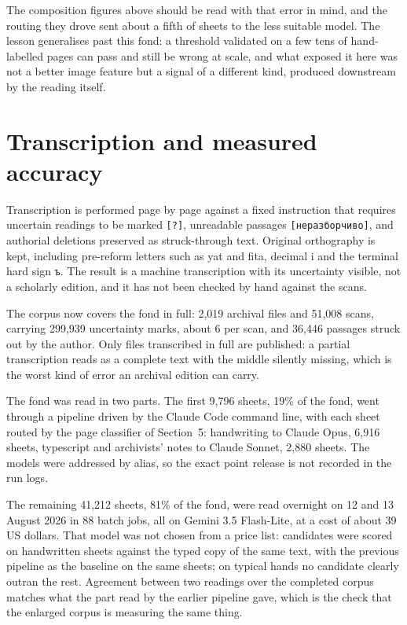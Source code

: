 \documentclass[11pt,a4paper]{article}
\begin{document}
The composition figures above should be read with that error in mind, and the
routing they drove sent about a fifth of sheets to the less suitable model.
The lesson generalises past this fond: a threshold validated on a few tens of
hand-labelled pages can pass and still be wrong at scale, and what exposed it
here was not a better image feature but a signal of a different kind, produced
downstream by the reading itself.

\section{Transcription and measured accuracy}\label{transcription-and-measured-accuracy}

Transcription is performed page by page against a fixed instruction that
requires uncertain readings to be marked \texttt{{[}?{]}}, unreadable passages
\texttt{{[}неразборчиво{]}}, and authorial deletions preserved as struck-through text.
Original orthography is kept, including pre-reform letters such as yat and
fita, decimal i and the terminal hard sign ъ. The result is a machine
transcription with its uncertainty visible, not a scholarly edition, and it
has not been checked by hand against the scans.

The corpus now covers the fond in full: 2,019 archival files and 51,008 scans,
carrying 299,939 uncertainty marks, about 6 per scan, and 36,446 passages
struck out by the author. Only files transcribed in full are published: a
partial transcription reads as a complete text with the middle silently
missing, which is the worst kind of error an archival edition can carry.

The fond was read in two parts. The first 9,796 sheets, 19\% of the fond, went
through a pipeline driven by the Claude Code command line, with each sheet
routed by the page classifier of Section~5: handwriting to Claude Opus, 6,916
sheets, typescript and archivists' notes to Claude Sonnet, 2,880 sheets. The
models were addressed by alias, so the exact point release is not recorded in
the run logs.

The remaining 41,212 sheets, 81\% of the fond, were read overnight on 12 and 13
August 2026 in 88 batch jobs, all on Gemini 3.5 Flash-Lite, at a cost of about
39 US dollars. That model was not chosen from a price list: candidates were
scored on handwritten sheets against the typed copy of the same text, with the
previous pipeline as the baseline on the same sheets; on typical hands no
candidate clearly outran the rest. Agreement between two readings over the
completed corpus matches what the part read by the earlier pipeline gave,
which is the check that the enlarged corpus is measuring the same thing.
\end{document}
